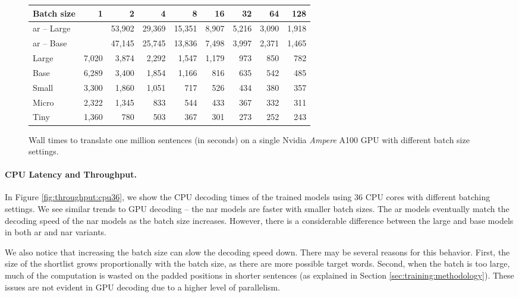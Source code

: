 \begin{figure}
  \centering
  
  \vspace{1\baselineskip}

  \begin{tabular}{lrrrrrrrr}
    \toprule
    Batch size & 1 & 2 & 4 & 8 & 16 & 32 & 64 & 128 \\
    \midrule
    \acs{ar} -- Large && 53,902 & 29,369 & 15,351 & 8,907 & 5,216 & 3,090 & 1,918 \\
    \acs{ar} -- Base  && 47,145 & 25,745 & 13,836 & 7,498 & 3,997 & 2,371 & 1,465 \\
    \midrule
    Large & 7,020 & 3,874 & 2,292 & 1,547 & 1,179 & 973 & 850 & 782 \\
    Base  & 6,289 & 3,400 & 1,854 & 1,166 &   816 & 635 & 542 & 485 \\
    Small & 3,300 & 1,860 & 1,051 &   717 &   526 & 434 & 380 & 357 \\
    Micro & 2,322 & 1,345 &   833 &   544 &   433 & 367 & 332 & 311 \\
    Tiny  & 1,360 &   780 &   503 &   367 &   301 & 273 & 252 & 243 \\
    \bottomrule
  \end{tabular}

  \caption{Wall times to translate one million sentences (in seconds) on a
    single Nvidia \emph{Ampere} A100 GPU with different batch size settings.}%
  \label{fig:throughput:a100}
\end{figure}


\paragraph{CPU Latency and Throughput.}
In Figure \ref{fig:throughput:cpu36}, we show the CPU decoding times of the
trained models using 36 CPU cores with different batching settings.  We see
similar trends to GPU decoding -- the \ac{nar} models are faster with smaller
batch sizes. The \ac{ar} models eventually match the decoding speed of the
\ac{nar} models as the batch size increases. However, there is a considerable
difference between the large and base models in both \ac{ar} and \ac{nar}
variants.

We also notice that increasing the batch size can slow the decoding speed
down. There may be several reasons for this behavior. First, the size of the
shortlist grows proportionally with the batch size, as there are more possible
target words. Second, when the batch is too large, much of the computation is
wasted on the padded positions in shorter sentences (as explained in Section
\ref{sec:training:methodology}). These issues are not evident in GPU decoding
due to a higher level of parallelism.

